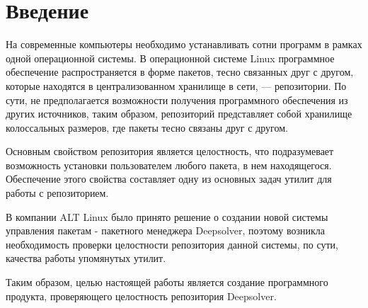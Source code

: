 \section*{Введение}
На современные компьютеры необходимо устанавливать сотни программ в рамках
одной операционной системы. В операционной системе Linux программное 
обеспечение распространяется в форме пакетов, тесно связанных друг с другом,
которые находятся в централизованном хранилище в сети, --- репозитории. По
сути, не предполагается возможности получения программного обеспечения из 
других источников, таким образом, репозиторий представляет собой хранилище 
колоссальных размеров, где пакеты тесно связаны друг с другом.

Основным свойством репозитория является целостность, что подразумевает
возможность установки пользователем любого пакета, в нем находящегося. 
Обеспечение этого свойства составляет одну из основных задач утилит для 
работы с репозиторием. 

В компании  ALT Linux было принято решение о создании новой системы
управления пакетам  - пакетного менеджера Deepsolver, поэтому возникла 
необходимость проверки целостности репозитория данной системы, по сути, 
качества работы упомянутых утилит. 

Таким образом, целью настоящей работы является создание программного 
продукта, проверяющего целостность репозитория Deepsolver.
